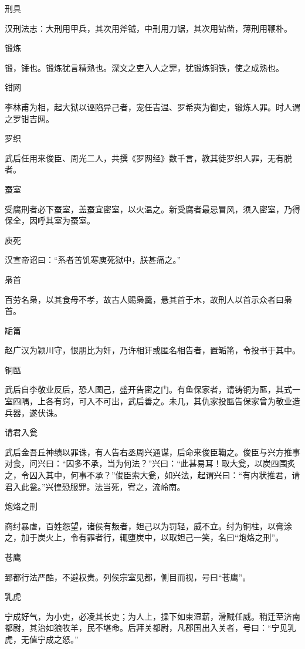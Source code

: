 \documentclass[a4paper,12pt,UTF8,twoside]{ctexbook}
\begin{document}
    刑具
    
    汉刑法志：大刑用甲兵，其次用斧钺，中刑用刀锯，其次用钻凿，薄刑用鞭朴。
    
    锻炼
    
    锻，锤也。锻炼犹言精熟也。深文之吏入人之罪，犹锻炼铜铁，使之成熟也。
    
    钳网
    
    李林甫为相，起大狱以诬陷异己者，宠任吉温、罗希奭为御史，锻炼人罪。时人谓之罗钳吉网。
    
    罗织
    
    武后任用来俊臣、周光二人，共撰《罗网经》数千言，教其徒罗织人罪，无有脱者。
    
    蚕室
    
    受腐刑者必下蚕室，盖蚕宜密室，以火温之。新受腐者最忌冒风，须入密室，乃得保全，因呼其室为蚕室。
    
    庾死
    
    汉宣帝诏曰：“系者苦饥寒庾死狱中，朕甚痛之。”
    
    枭首
    
    百劳名枭，以其食母不孝，故古人赐枭羹，悬其首于木，故刑人以首示众者曰枭首。
    
    缿筩
    
    赵广汉为颖川守，恨朋比为奸，乃许相讦或匿名相告者，置缿筩，令投书于其中。
    
    铜匦
    
    武后自李敬业反后，恐人图己，盛开告密之门。有鱼保家者，请铸铜为匦，其式一室四隅，上各有窍，可入不可出，武后善之。未几，其仇家投匦告保家曾为敬业造兵器，遂伏诛。
    
    请君入瓮
    
    武后金吾丘神绩以罪诛，有人告右丞周兴通谋，后命来俊臣鞫之。俊臣与兴方推事对食，问兴曰：“囚多不承，当为何法？”兴曰：“此甚易耳！取大瓮，以炭四围炙之，令囚入其中，何事不承？”俊臣索大瓮，如兴法，起谓兴曰：“有内状推君，请君入此瓮。”兴惶恐服罪。法当死，宥之，流岭南。
    
    炮烙之刑
    
    商纣暴虐，百姓怨望，诸侯有叛者，妲己以为罚轻，威不立。纣为铜柱，以膏涂之，加于炭火上，令有罪者行，辄堕炭中，以取妲己一笑，名曰“炮烙之刑”。
    
    苍鹰
    
    郅都行法严酷，不避权贵。列侯宗室见都，侧目而视，号曰“苍鹰”。
    
    乳虎
    
    宁成好气，为小吏，必凌其长吏；为人上，操下如束湿薪，滑贼任威。稍迁至济南都尉，其治如狼牧羊，民不堪命。后拜关都尉，凡郡国出入关者，号曰：“宁见乳虎，无值宁成之怒。”
    
\end{document}
